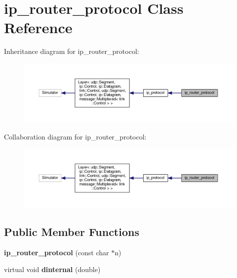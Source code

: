 \hypertarget{classip__router__protocol}{}\section{ip\+\_\+router\+\_\+protocol Class Reference}
\label{classip__router__protocol}


Inheritance diagram for ip\+\_\+router\+\_\+protocol\+:
\nopagebreak
\begin{figure}[H]
\begin{center}
\leavevmode
\includegraphics[width=350pt]{classip__router__protocol__inherit__graph}
\end{center}
\end{figure}


Collaboration diagram for ip\+\_\+router\+\_\+protocol\+:
\nopagebreak
\begin{figure}[H]
\begin{center}
\leavevmode
\includegraphics[width=350pt]{classip__router__protocol__coll__graph}
\end{center}
\end{figure}
\subsection*{Public Member Functions}
\begin{DoxyCompactItemize}
\item 
{\bfseries ip\+\_\+router\+\_\+protocol} (const char $\ast$n)\hypertarget{classip__router__protocol_ada17ebcf7f7b834d9c62133815d4669d}{}\label{classip__router__protocol_ada17ebcf7f7b834d9c62133815d4669d}

\item 
virtual void {\bfseries dinternal} (double)\hypertarget{classip__router__protocol_a14cf3c7e1418ee8c6035b79626f99438}{}\label{classip__router__protocol_a14cf3c7e1418ee8c6035b79626f99438}

\end{DoxyCompactItemize}
